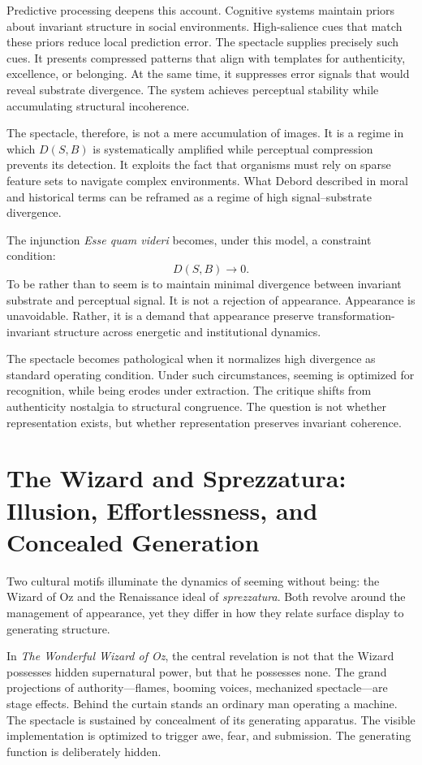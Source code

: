 \documentclass[11pt]{article}
\begin{document}
Predictive processing deepens this account. Cognitive systems maintain priors about invariant structure in social environments. High-salience cues that match these priors reduce local prediction error. The spectacle supplies precisely such cues. It presents compressed patterns that align with templates for authenticity, excellence, or belonging. At the same time, it suppresses error signals that would reveal substrate divergence. The system achieves perceptual stability while accumulating structural incoherence.

The spectacle, therefore, is not a mere accumulation of images. It is a regime in which $D(S,B)$ is systematically amplified while perceptual compression prevents its detection. It exploits the fact that organisms must rely on sparse feature sets to navigate complex environments. What Debord described in moral and historical terms can be reframed as a regime of high signal–substrate divergence.

The injunction \textit{Esse quam videri} becomes, under this model, a constraint condition:
\[
D(S,B) \to 0.
\]
To be rather than to seem is to maintain minimal divergence between invariant substrate and perceptual signal. It is not a rejection of appearance. Appearance is unavoidable. Rather, it is a demand that appearance preserve transformation-invariant structure across energetic and institutional dynamics.

The spectacle becomes pathological when it normalizes high divergence as standard operating condition. Under such circumstances, seeming is optimized for recognition, while being erodes under extraction. The critique shifts from authenticity nostalgia to structural congruence. The question is not whether representation exists, but whether representation preserves invariant coherence.

\section{The Wizard and Sprezzatura: Illusion, Effortlessness, and Concealed Generation}

Two cultural motifs illuminate the dynamics of seeming without being: the Wizard of Oz and the Renaissance ideal of \textit{sprezzatura}. Both revolve around the management of appearance, yet they differ in how they relate surface display to generating structure.

In \textit{The Wonderful Wizard of Oz}, the central revelation is not that the Wizard possesses hidden supernatural power, but that he possesses none. The grand projections of authority—flames, booming voices, mechanized spectacle—are stage effects. Behind the curtain stands an ordinary man operating a machine. The spectacle is sustained by concealment of its generating apparatus. The visible implementation is optimized to trigger awe, fear, and submission. The generating function is deliberately hidden.
\end{document}
